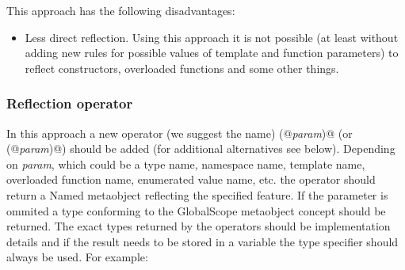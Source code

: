 This approach has the following disadvantages:

\begin{itemize}
	\item Less direct reflection. Using this approach it is not possible
	(at least without adding new rules for possible values of template
	and function parameters) to reflect constructors, overloaded functions
	and some other things.
\end{itemize}

\subsubsection{Reflection operator}

In this approach a new operator (we suggest the name) \verb@mirrored(@{\em param}\verb@)@
(or \verb@reflected(@{\em param}\verb@)@)
should be added (for additional alternatives see below).
Depending on {\em param}, which could be a type name, namespace name,
template name, overloaded function name, enumerated value name, etc. the operator should
return a {\metaobject Named} metaobject reflecting the specified feature.
If the parameter is ommited a type conforming to the {\metaobject GlobalScope} metaobject
concept should be returned.
The exact types returned by the operators should be implementation details and if the
result needs to be stored in a variable the \verb@auto@ type specifier should always
be used.
For example:

